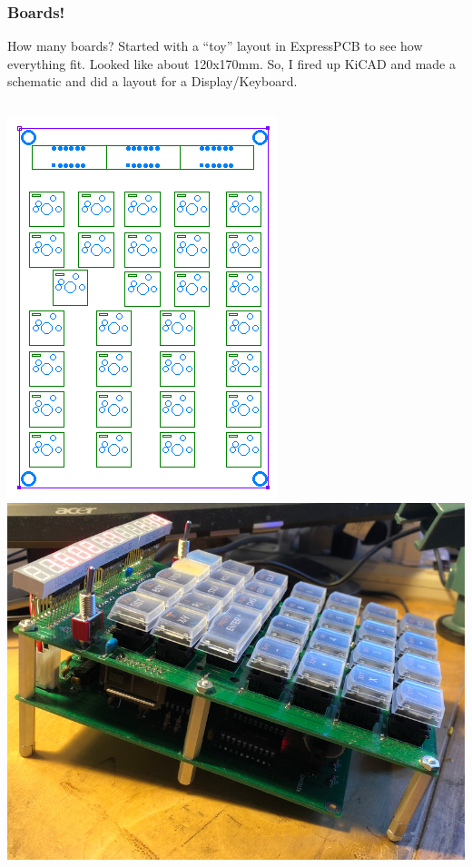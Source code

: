 \documentclass{beamer}
\begin{document}
\begin{frame}
  \frametitle{Boards!}

  \scriptsize
  How many boards?  Started with a ``toy'' layout in ExpressPCB to
  see how everything fit.  Looked like about 120x170mm.  So, I fired
  up KiCAD and made a schematic and did a layout for a Display/Keyboard.

  \vskip 0.15in

\begin{columns}
  \includegraphics[width=\textwidth]{figs/sample_epcb.png}
  \includegraphics[width=\textwidth]{figs/side_view.jpg} 

\end{columns}
\end{frame}
\end{document}
